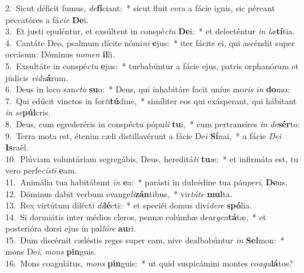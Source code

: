 {2.~}Sicut déficit fumus, \textit{de}\textbf{fí}ciant:~* sicut fluit cera a fácie ignis, sic péreant peccatóres a fá\textit{ci}\textit{e} \textbf{De}i.\\
{3.~}Et justi epuléntur, et exsúltent in conspé\textit{ctu} \textbf{De}i:~* et delecténtur \textit{in} \textit{læ}\textbf{tí}tia.\\
{4.~}Cantáte Deo, psalmum dícite nómi\textit{ni} \textbf{e}jus:~* iter fácite ei, qui ascéndit super occásum: Dóminus \textit{no}\textit{men} \textbf{il}li.\\
{5.~}Exsultáte in conspé\textit{ctu} \textbf{e}jus:~* turbabúntur a fácie ejus, patris orphanórum et júdicis \textit{vi}\textit{du}\textbf{á}rum.\\
{6.~}Deus in loco san\textit{cto} \textbf{su}o:~* Deus, qui inhabitáre facit uníus mo\textit{ris} \textit{in} \textbf{do}mo:\\
{7.~}Qui edúcit vinctos in for\textit{ti}\textbf{tú}dine,~* simíliter eos qui exásperant, qui hábitant \textit{in} \textit{se}\textbf{púl}cris.\\
{8.~}Deus, cum egrederéris in conspéctu pópu\textit{li} \textbf{tu}i,~* cum pertransíres \textit{in} \textit{de}\textbf{sér}to:\\
{9.~}Terra mota est, étenim cæli distillavérunt a fácie De\textit{i} \textbf{Sí}nai,~* a fácie \textit{De}\textit{i} \textbf{Is}raël.\\
{10.~}Plúviam voluntáriam segregábis, Deus, hereditá\textit{ti} \textbf{tu}æ:~* et infirmáta est, tu vero perfe\textit{cí}\textit{sti} \textbf{e}am.\\
{11.~}Animália tua habitábunt \textit{in} \textbf{e}a:~* parásti in dulcédine tua páu\textit{pe}\textit{ri}, \textbf{De}us.\\
{12.~}Dóminus dabit verbum evange\textit{li}\textbf{zán}tibus,~* vir\textit{tú}\textit{te} \textbf{mul}ta.\\
{13.~}Rex virtútum dilécti \textit{di}\textbf{lé}cti:~* et speciéi domus diví\textit{de}\textit{re} \textbf{spó}lia.\\
{14.~}Si dormiátis inter médios cleros, pennæ colúmbæ dear\textit{gen}\textbf{tá}tæ,~* et posterióra dorsi ejus in pal\textit{ló}\textit{re} \textbf{au}ri.\\
{15.~}Dum discérnit cæléstis reges super eam, nive dealbabúntur \textit{in} \textbf{Sel}mon:~* mons De\textit{i}, \textit{mons} \textbf{pin}guis.\\
{16.~}Mons coagulátus, \textit{mons} \textbf{pin}guis:~* ut quid suspicámini montes co\textit{a}\textit{gu}\textbf{lá}tos?\\
